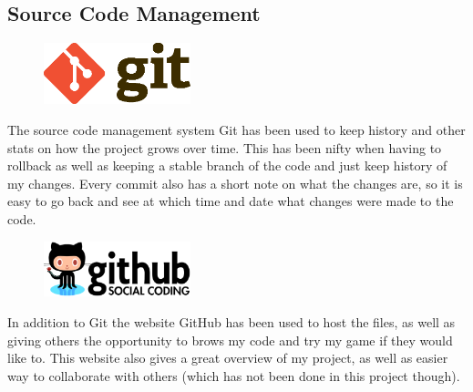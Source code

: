 \documentclass[a4paper,12pt]{article}
\begin{document}
\subsection{Source Code Management}
\begin{figure}
    \vspace{-20pt}
    \begin{center}
        \includegraphics[width=0.38\textwidth]{img/git-logo.eps}
    \end{center}
    \vspace{-20pt}
\end{figure}
The source code management system Git has been used to keep history and other stats on how the project grows over time.
This has been nifty when having to rollback as well as keeping a stable branch of the code and just keep history of my changes.
Every commit also has a short note on what the changes are, so it is easy to go back and see at which time and date what changes were made to the code.


\begin{figure}
    \vspace{-20pt}
    \begin{center}
        \includegraphics[width=0.38\textwidth]{img/github-logo.eps}
    \end{center}
    \vspace{-20pt}
\end{figure}
In addition to Git the website GitHub has been used to host the files, as well as giving others the opportunity to brows my code and try my game if they would like to.
This website also gives a great overview of my project, as well as easier way to collaborate with others (which has not been done in this project though). 



\clearpage
\end{document}
